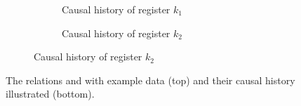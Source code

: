 \begin{figure}[tpb]
	\begin{subfigure}[b]{\textwidth}
		\centering
		\def\dist{15pt}
		\begin{subfigure}[b]{0.45\textwidth}
			\centering
			\caption{Causal history of register \(k_1\)}\label{fig:causal-history-k1}
		\end{subfigure}
		\hspace{1em}
		\begin{subfigure}[b]{0.45\textwidth}
			\centering
			\caption{Causal history of register \(k_2\)}\label{fig:causal-history-k2}
		\end{subfigure}
	\end{subfigure}

	\caption{
		The relations  and  with example data (top)
		and their causal history illustrated (bottom).
	}\label{fig:mvr-store-relations}
\end{figure}
